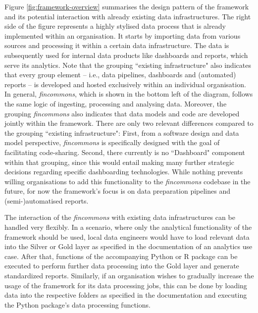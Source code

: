 \documentclass[a4paper, 11pt]{report}
\begin{document}
Figure \ref{fig:framework-overview} summarises the design pattern of the framework and its potential interaction with already existing data infrastructures. The right side of the figure represents a highly stylised data process that is already implemented within an organisation. It starts by importing data from various sources and processing it within a certain data infrastructure. The data is subsequently used for internal data products like dashboards and reports, which serve its analytics. Note that the grouping ``existing infrastructure" also indicates that every group element -- i.e., data pipelines, dashboards and (automated) reports -- is developed and hosted exclusively within an individual organisation. In general, \emph{fincommons}, which is shown in the bottom left of the diagram, follows the same logic of ingesting, processing and analysing data. Moreover, the grouping \emph{fincommons} also indicates that data models and code are developed jointly within the framework. There are only two relevant differences compared to the grouping ``existing infrastructure": First, from a software design and data model perspective, \emph{fincommons} is specifically designed with the goal of facilitating code-sharing. Second, there currently is no ``Dashboard" component within that grouping, since this would entail making many further strategic decisions regarding specific dashboarding technologies. While nothing prevents willing organisations to add this functionality to the \emph{fincommons} codebase in the future, for now the framework's focus is on data preparation pipelines and (semi-)automatised reports.

The interaction of the \emph{fincommons} with existing data infrastructures can be handled very flexibly. In a scenario, where only the analytical functionality of the framework should be used, local data engineers would have to load relevant data into the Silver or Gold layer as specified in the documentation of an analytics use case. After that, functions of the accompanying Python or R package can be executed to perform further data processing into the Gold layer and generate standardized reports. Similarly, if an organisation wishes to gradually increase the usage of the framework for its data processing jobs, this can be done by loading data into the respective folders as specified in the documentation and executing the Python package's data processing functions.
\end{document}
